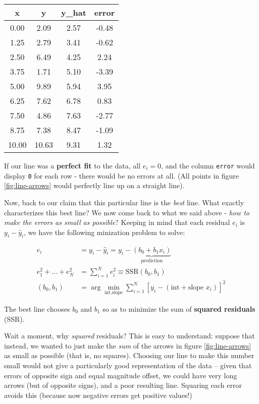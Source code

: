 \documentclass[]{book}
\newenvironment{warning}{\begin{tcolorbox}[colback=orange!5!white,colframe=orange]}{\end{tcolorbox}}
\begin{document}
\begin{tabular}{c|c|c|c}
\hline
x & y & y\_hat & error\\
\hline
0.00 & 2.09 & 2.57 & -0.48\\
\hline
1.25 & 2.79 & 3.41 & -0.62\\
\hline
2.50 & 6.49 & 4.25 & 2.24\\
\hline
3.75 & 1.71 & 5.10 & -3.39\\
\hline
5.00 & 9.89 & 5.94 & 3.95\\
\hline
6.25 & 7.62 & 6.78 & 0.83\\
\hline
7.50 & 4.86 & 7.63 & -2.77\\
\hline
8.75 & 7.38 & 8.47 & -1.09\\
\hline
10.00 & 10.63 & 9.31 & 1.32\\
\hline
\end{tabular}

If our line was a \textbf{perfect fit} to the data, all \(e_i = 0\), and
the column \texttt{error} would display \texttt{0} for each row - there
would be no errors at all. (All points in figure \ref{fig:line-arrows}
would perfectly line up on a straight line).

Now, back to our claim that this particular line is the \emph{best}
line. What exactly characterizes this best line? We now come back to
what we said above - \emph{how to make the errors as small as possible}?
Keeping in mind that each residual \(e_i\) is \(y_i - \hat{y}_i\), we
have the following minization problem to solve:

\begin{align}
e_i & = y_i - \hat{y}_i = y_i - \underbrace{\left(b_0 + b_1 x_i\right)}_\text{prediction}\\
e_1^2 + \dots + e_N^2 &= \sum_{i=1}^N e_i^2 \equiv \text{SSR}(b_0,b_1) \\
(b_0,b_1) &= \arg \min_{\text{int},\text{slope}} \sum_{i=1}^N \left[y_i - \left(\text{int} + \text{slope } x_i\right)\right]^2 \label{eq:ols-min}
\end{align}

\begin{warning}
The best line chooses \(b_0\) and \(b_1\) so as to minimize the sum of
\textbf{squared residuals} (SSR).
\end{warning}

 Wait a moment, why \emph{squared} residuals? This is easy to
understand: suppose that instead, we wanted to just make the \emph{sum}
of the arrows in figure \ref{fig:line-arrows} as small as possible (that
is, no squares). Choosing our line to make this number small would not
give a particularly good representation of the data -- given that errors
of opposite sign and equal magnitude offset, we could have very long
arrows (but of opposite signs), and a poor resulting line. Squaring each
error avoids this (because now negative errors get positive values!)
\end{document}
